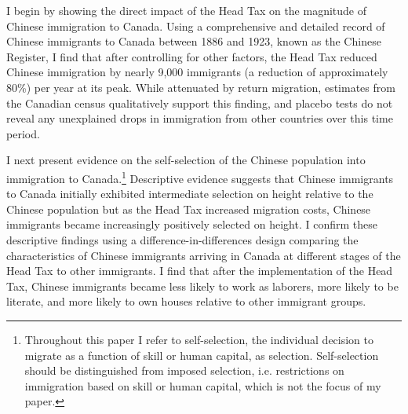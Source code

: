 I begin by showing the direct impact of the Head Tax on the magnitude of Chinese immigration to Canada. Using a comprehensive and detailed record of Chinese immigrants to Canada between 1886 and 1923, known as the Chinese Register, I find that after controlling for other factors, the Head Tax reduced Chinese immigration by nearly 9,000 immigrants (a reduction of approximately 80\%) per year at its peak. While attenuated by return migration, estimates from the Canadian census qualitatively support this finding, and placebo tests do not reveal any unexplained drops in immigration from other countries over this time period.

I next present evidence on the self-selection of the Chinese population into immigration to Canada.\footnote{Throughout this paper I refer to self-selection, the individual decision to migrate as a function of skill or human capital, as selection. Self-selection should be distinguished from imposed selection, i.e. restrictions on immigration based on skill or human capital, which is not the focus of my paper.} 
Descriptive evidence suggests that Chinese immigrants to Canada initially exhibited intermediate selection on height relative to the Chinese population but as the Head Tax increased migration costs, Chinese immigrants became increasingly positively selected on height. I confirm these descriptive findings using a difference-in-differences design comparing the characteristics of Chinese immigrants arriving in Canada at different stages of the Head Tax to other immigrants. I find that after the implementation of the Head Tax, Chinese immigrants became less likely to work as laborers, more likely to be literate, and more likely to own houses relative to other immigrant groups.  



